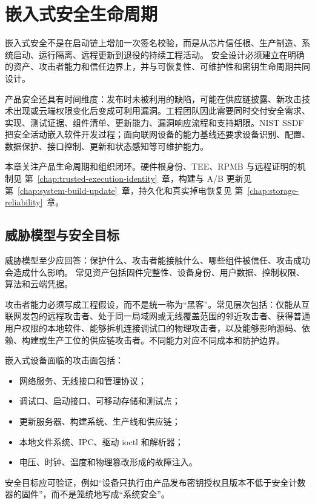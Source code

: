\chapter{嵌入式安全生命周期}
\label{chap:security-lifecycle}

嵌入式安全不是在启动链上增加一次签名校验，而是从芯片信任根、生产制造、系统启动、运行隔离、远程更新到退役的持续工程活动。
安全设计必须建立在明确的资产、攻击者能力和信任边界上，并与可恢复性、可维护性和密钥生命周期共同设计。

产品安全还具有时间维度：发布时未被利用的缺陷，可能在供应链披露、新攻击技术出现或云端权限变化后变成可利用漏洞。工程团队因此需要同时交付安全需求、实现、测试证据、组件清单、更新能力、漏洞响应流程和支持期限。NIST SSDF 把安全活动嵌入软件开发过程\cite{nist-ssdf}；面向联网设备的能力基线还要求设备识别、配置、数据保护、接口控制、更新和状态感知等可维护能力\cite{nist-iot-core-baseline}。

本章关注产品生命周期和组织闭环。硬件根身份、TEE、RPMB 与远程证明的机制见 \mbox{第~\ref{chap:trusted-execution-identity}~章}，构建与 A/B 更新见 \mbox{第~\ref{chap:system-build-update}~章}，持久化和真实掉电恢复见 \mbox{第~\ref{chap:storage-reliability}~章}。

\section{威胁模型与安全目标}

威胁模型至少应回答：保护什么、攻击者能接触什么、哪些组件被信任、攻击成功会造成什么影响。
常见资产包括固件完整性、设备身份、用户数据、控制权限、算法和云端凭据。

攻击者能力必须写成工程假设，而不是统一称为“黑客”。常见层次包括：仅能从互联网发包的远程攻击者、处于同一局域网或无线覆盖范围的邻近攻击者、获得普通用户权限的本地软件、能够拆机连接调试口的物理攻击者，以及能够影响源码、依赖、构建或生产工位的供应链攻击者。不同能力对应不同成本和防护边界。

嵌入式设备面临的攻击面包括：
\begin{itemize}
  \item 网络服务、无线接口和管理协议；
  \item 调试口、启动接口、可移动存储和测试点；
  \item 更新服务器、构建系统、生产线和供应链；
  \item 本地文件系统、IPC、驱动 ioctl 和解析器；
  \item 电压、时钟、温度和物理篡改形成的故障注入。
\end{itemize}
安全目标应可验证，例如“设备只执行由产品发布密钥授权且版本不低于安全计数器的固件”，而不是笼统地写成“系统安全”。

